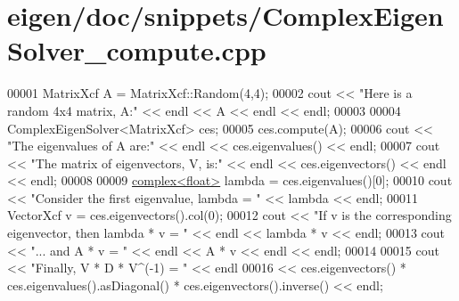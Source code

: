 \hypertarget{eigen_2doc_2snippets_2_complex_eigen_solver__compute_8cpp_source}{}\section{eigen/doc/snippets/\+Complex\+Eigen\+Solver\+\_\+compute.cpp}
\label{eigen_2doc_2snippets_2_complex_eigen_solver__compute_8cpp_source}

\begin{DoxyCode}
00001 MatrixXcf A = MatrixXcf::Random(4,4);
00002 cout << \textcolor{stringliteral}{"Here is a random 4x4 matrix, A:"} << endl << A << endl << endl;
00003 
00004 ComplexEigenSolver<MatrixXcf> ces;
00005 ces.compute(A);
00006 cout << \textcolor{stringliteral}{"The eigenvalues of A are:"} << endl << ces.eigenvalues() << endl;
00007 cout << \textcolor{stringliteral}{"The matrix of eigenvectors, V, is:"} << endl << ces.eigenvectors() << endl << endl;
00008 
00009 \hyperlink{structcomplex}{complex<float>} lambda = ces.eigenvalues()[0];
00010 cout << \textcolor{stringliteral}{"Consider the first eigenvalue, lambda = "} << lambda << endl;
00011 VectorXcf v = ces.eigenvectors().col(0);
00012 cout << \textcolor{stringliteral}{"If v is the corresponding eigenvector, then lambda * v = "} << endl << lambda * v << endl;
00013 cout << \textcolor{stringliteral}{"... and A * v = "} << endl << A * v << endl << endl;
00014 
00015 cout << \textcolor{stringliteral}{"Finally, V * D * V^(-1) = "} << endl
00016      << ces.eigenvectors() * ces.eigenvalues().asDiagonal() * ces.eigenvectors().inverse() << endl;
\end{DoxyCode}
